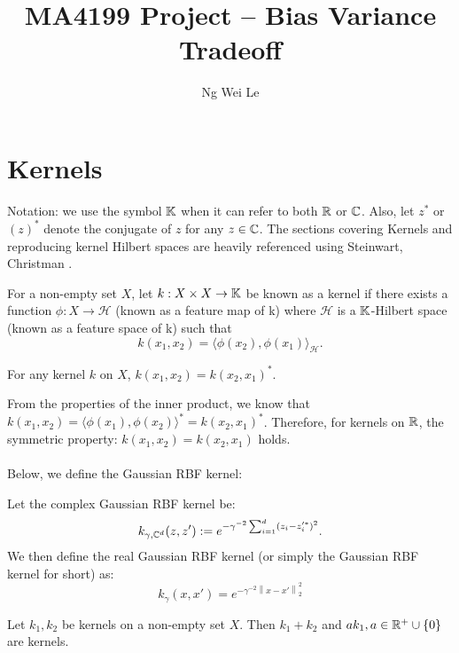 \documentclass[english]{article}
\title{MA4199 Project -- Bias Variance Tradeoff}
\date{}
\author{Ng Wei Le}
\newcommand\norm[1]{\left\lVert#1\right\rVert}
\newcommand\inner[1]{\langle#1\rangle}
\begin{document}
\maketitle
\section{Kernels} \label{sec:Kernels}
Notation: we use the symbol $\mathbb{K}$  when it can refer to both $\mathbb{R}$ or $\mathbb{C}$. Also, let $z^*$ or $(z)^*$ denote the conjugate of $z$ for any $z \in \mathbb{C}$.
The sections covering Kernels and reproducing kernel Hilbert spaces are heavily referenced using Steinwart, Christman \cite{steinwartSVM}.
\begin{defn}
	For a non-empty set $X$, let $k: X \times X \rightarrow \mathbb{K}$ be known as a kernel if there exists a function $\phi: X \rightarrow \mathcal{H}$ (known as a feature map of k) where $\mathcal{H}$ is a $\mathbb{K}$-Hilbert space (known as a feature space of k) such that
	\begin{equation}
	k(x_1, x_2) = \inner{\phi(x_2), \phi(x_1)}_\mathcal{H}.
	\end{equation}
\end{defn}

\begin{lem}
	For any kernel $k$ on $X$, $k(x_1, x_2) = k(x_2, x_1)^*$.
\end{lem}
\noindent
From the properties of the inner product, we know that $k(x_1, x_2) = \inner{\phi(x_1), \phi(x_2)}^* = k(x_2, x_1)^*$. Therefore, for kernels on $\mathbb{R}$, the symmetric property: $k(x_1, x_2) = k(x_2, x_1)$ holds.
\\\\Below, we define the Gaussian RBF kernel:
\begin{defn}
Let the complex Gaussian RBF kernel be:
\[ k_{\gamma, \mathbb{C}^d}(z, z') := e^{-\gamma^{-2} \sum_{i=1}^{d} (z_i - z_i'^*)^2 } .\]
We then define the real Gaussian RBF kernel (or simply the Gaussian RBF kernel for short) as:
\[ k_\gamma(x, x') = e^{- \gamma^{-2} \norm{x - x'}_2^2} \]
\end{defn}
\begin{lem}
	Let $k_1, k_2$ be kernels on a non-empty set $X$. Then $k_1 + k_2$ and $ak_1, a \in \mathbb{R}^+ \cup \{0\}$ are kernels. 
\end{lem}
\end{document}
